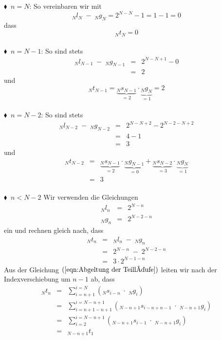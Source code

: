 \documentclass[11pt,oneside,a4paper]{scrreprt}
\begin{document}
\noindent $\blacklozenge\;\;n=N$: So vereinbaren wir mit  
\begin{equation}
_Nl_N\;-\;_Ng_N=2^{N-N}-1=1-1=0
\end{equation}
dass
\begin{equation}
_Nt_N=0
\end{equation}\\
$\blacklozenge\;\;n=N-1$: So sind stets 
\begin{eqnarray}
_Nl_{N-1}\;-\;_Ng_{N-1}&=&2^{N-N+1}-0\\
&=&2
\end{eqnarray}
und
\begin{equation}
_Nt_{N-1}=\underbrace{_{N}s_{N-1}}_{=2}\cdot\underbrace{_Ng_N}_{=1} =2
\end{equation}\\
$\blacklozenge\;\;n=N-2$: So sind stets
\begin{eqnarray}
_Nl_{N-2}\;-\;_Ng_{N-2}&=&2^{N-N+2}-2^{N-2-N+2}\\
&=&4-1\\
&=&3
\end{eqnarray}
und
\begin{eqnarray}
_Nt_{N-2}&=& \underbrace{_{N}s_{N-1}}_{=2}\cdot\underbrace{_Ng_{N-1}}_{=0}+\underbrace{_{N}s_{N-2}}_{=3}\cdot\underbrace{_Ng_N}_{=1}\\
&=&3
\end{eqnarray}\\
$\blacklozenge\;\; n<N-2$  Wir verwenden die Gleichungen
	\begin{eqnarray}
	_Nl_n&=& 2^{N-n}\\
	_Ng_n&=& 2^{N-2-n}
	\end{eqnarray}
ein und rechnen gleich nach, dass
	\begin{eqnarray}
		_Nt_n&=&_Nl_n\;-\;_Ng_n\\
		&=&2^{N-n}\;-\; 2^{N-2-n}\\
		&=&3\cdot 2^{N-1-n}
	\end{eqnarray}
Aus der Gleichung $(\ref{eqn:Abgeltung der Teilläufe})$ leiten wir nach der Indexverschiebung um $n-1$ ab, dass
	\begin{eqnarray}
	_{N}t_n&=&\sum_{i=n+1}^{i=N}\left(_Ns_{i-n}\;\cdot\;_Ng_i\right)\\
	&=&\sum_{i=n+1-n+1}^{i=N-n+1}\left(_{N-n+1}s_{i-n+n-1}\;\cdot\;_{N-n+1}g_i\right)\\
	&=&\sum_{i=2}^{i=N-n+1}\left(_{N-n+1}s_{i-1}\;\cdot\;_{N-n+1}g_i\right)\\
	&=&_{N-n+1}t_1\\		
	\end{eqnarray}
\end{document}
